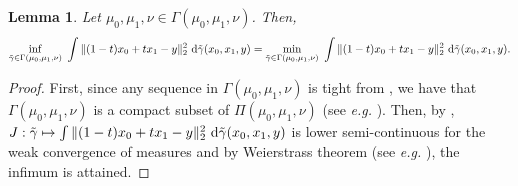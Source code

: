 \documentclass[twoside]{article}
\newtheorem{lemma}{Lemma}
\begin{document}
\begin{lemma}
    Let $\mu_0,\mu_1,\nu\in\Gamma(\mu_0,\mu_1,\nu)$. Then,
    \begin{equation}
        \inf_{\Tilde{\gamma}\in\Gamma(\mu_0,\mu_1,\nu)}\ \int \|(1-t)x_0+tx_1-y\|_2^2\ \mathrm{d}\Tilde{\gamma}(x_0,x_1,y) = \min_{\Tilde{\gamma}\in\Gamma(\mu_0,\mu_1,\nu)}\ \int \|(1-t)x_0+tx_1-y\|_2^2\ \mathrm{d}\Tilde{\gamma}(x_0,x_1,y).
    \end{equation}
\end{lemma}

\begin{proof}
    First, since any sequence in $\Gamma(\mu_0,\mu_1,\nu)$ is tight from , we have that $\Gamma(\mu_0,\mu_1,\nu)$ is a compact subset of $\Pi(\mu_0,\mu_1,\nu)$ (see \emph{e.g.} \citep[Proof of Theorem 1.4]{santambrogio2015optimal}). Then, by \citep[Lemma 1.6]{santambrogio2015optimal}, $J:\Tilde{\gamma}\mapsto \int \|(1-t)x_0+tx_1-y\|_2^2\ \mathrm{d}\Tilde{\gamma}(x_0,x_1,y)$ is lower semi-continuous for the weak convergence of measures and by Weierstrass theorem (see \emph{e.g.} \citep[Box 1.1]{santambrogio2015optimal}), the infimum is attained.
\end{proof}
\end{document}
